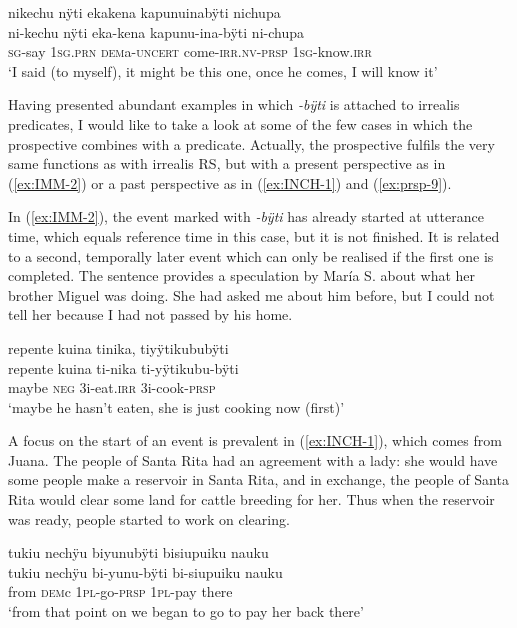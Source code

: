 \ea\label{ex:prsp-8}
\begingl
\glpreamble nikechu nÿti ekakena kapunuinabÿti nichupa\\
\gla ni-kechu nÿti eka-kena kapunu-ina-bÿti ni-chupa\\
\textsc{sg}-say 1\textsc{sg.prn} \textsc{dem}a-\textsc{uncert} come-\textsc{irr.nv}-\textsc{prsp} 1\textsc{sg}-know.\textsc{irr}\\
\glft ‘I said (to myself), it might be this one, once he comes, I will know it’
\endgl
\trailingcitation{[jxx-p120430l-1.093]}
\xe


Having presented abundant examples in which \textit{-bÿti} is attached to irrealis predicates, I would like to take a look at some of the few cases in which the prospective combines with a  predicate. Actually, the prospective fulfils the very same functions as with irrealis RS, but with a present perspective as in (\ref{ex:IMM-2}) or a past perspective as in (\ref{ex:INCH-1}) and (\ref{ex:prsp-9}).

In (\ref{ex:IMM-2}), the event marked with \textit{-bÿti} has already started at utterance time, which equals reference time in this case, but it is not finished. It is related to a second, temporally later event which can only be realised if the first one is completed.  The sentence provides a speculation by María S. about what her brother Miguel was doing. She had asked me about him before, but I could not tell her because I had not passed by his home.

\ea\label{ex:IMM-2}
\begingl 
\glpreamble repente kuina tinika, tiyÿtikububÿti \\
\gla repente kuina ti-nika ti-yÿtikubu-bÿti \\ 
\glb maybe \textsc{neg} 3i-eat.\textsc{irr} 3i-cook-\textsc{prsp}\\ 
\glft ‘maybe he hasn’t eaten, she is just cooking now (first)’
\trailingcitation{[rxx-e120511l.339]}
\xe

A focus on the start of an event is prevalent in (\ref{ex:INCH-1}), which comes from Juana. The people of Santa Rita had an agreement with a lady: she would have some people make a reservoir in Santa Rita, and in exchange, the people of Santa Rita would clear some land for cattle breeding for her. Thus when the reservoir was ready, people started to work on clearing.

\ea\label{ex:INCH-1}
\begingl 
\glpreamble tukiu nechÿu biyunubÿti bisiupuiku nauku\\
\gla tukiu nechÿu bi-yunu-bÿti bi-siupuiku nauku\\ 
\glb from \textsc{dem}c 1\textsc{pl}-go-\textsc{prsp} 1\textsc{pl}-pay there \\ 
\glft ‘from that point on we began to go to pay her back there’
\trailingcitation{[jxx-p120515l-2.084]}
\xe

